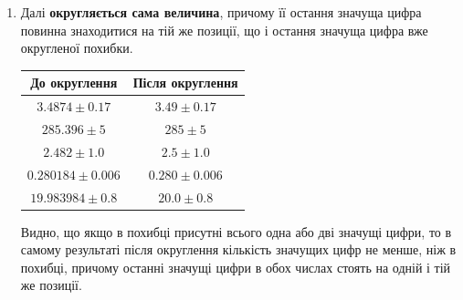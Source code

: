 \documentclass{LabBook}
\begin{document}
\begin{enumerate}
    \item Далі \textbf{округляється сама величина}, причому її остання значуща цифра повинна знаходитися на тій же позиції, що і остання значуща цифра вже округленої похибки.
          \begin{center}
            \begin{tabular}{cc}
              \toprule
              До округлення      & Після округлення \\ \midrule
              $3.4874\pm0.17$    & $3.49\pm0.17$    \\
              $285.396\pm5$      & $285\pm5$        \\
              $2.482\pm1.0$      & $2.5\pm1.0$      \\
              $0.280184\pm0.006$ & $0.280\pm0.006$  \\
              $19.983984\pm0.8$  & $20.0\pm0.8$     \\ \bottomrule
            \end{tabular}
          \end{center}

          Видно, що якщо в похибці присутні всього одна або дві значущі цифри, то в самому результаті після округлення кількість значущих цифр не менше, ніж в похибці, причому останні значущі цифри в обох числах стоять на одній і тій же позиції.


\end{enumerate}
\end{document}
